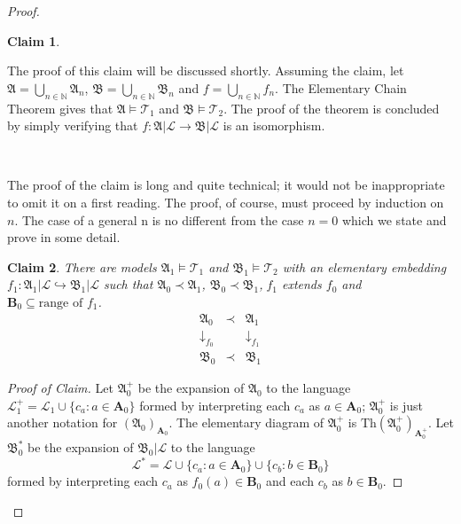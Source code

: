 \documentclass[titlepage, oneside]{amsbook}
\theoremstyle{plain}
\newtheorem*{claim}{Claim}
\theoremstyle{definition}
\theoremstyle{remark}
\newcommand{\Th}{\ensuremath{\mbox{Th}}}
\newcommand{\theory}{\ensuremath{\mathcal{T}}}
\newcommand{\lan}{\ensuremath{\mathcal{L}}}
\newcommand{\seq}{\ensuremath{\subseteq}}
\newcommand{\ma}{\ensuremath{\mathfrak{A}}}
\newcommand{\mb}{\ensuremath{\mathfrak{B}}}
\newcommand{\ba}{\ensuremath{\mathbf{A}}}
\newcommand{\bb}{\ensuremath{\mathbf{B}}}
\begin{document}
\begin{proof}
\begin{claim}
\end{claim}
 
\par
The proof of this claim will be discussed shortly. Assuming the
claim, let $\ma = \bigcup_{n \in \mathbb N} \ma_n$,
$\mb = \bigcup_{n \in \mathbb N} \mb_n$ and $f = \bigcup_{n \in \mathbb
N} f_n$.
The Elementary Chain Theorem gives that $\ma \models \theory_1$ and
$\mb
\models \theory_2$.  The proof of the theorem is concluded by simply
verifying that  $f: \ma | \lan \to \mb | \lan$ is an
isomorphism.

\

The proof of the claim is long and quite technical; it would not be
inappropriate to omit it on a first reading.  The proof, of course,
must proceed by induction on $n$.  The case of a general n is no
different from the case $n=0$ which we state and prove in some detail.

\begin{claim}  There are models $\ma_1 \models \theory_1 $ and $\mb_1
\models \theory_2 $ with an
elementary embedding $f_1 : \ma_1 |\lan \hookrightarrow \mb_1
|\lan $
such that $\ma_0 \prec \ma_1 $, $\mb_0 \prec \mb_1 $,$\; f_1 $ extends
$f_0$ 
and\\
$\bb_0 \seq \mbox{range of } f_1$.
\[ \begin{array}{ccc}
\ma_0  &\prec &\ma_1 \\
\downarrow_{f_0}  &{}  &\downarrow_{f_1} \\
\mb_0 &\prec &\mb_1
\end{array}
\]

\end{claim}

\begin{proof}[Proof of Claim] Let $\ma_0^+ $ be the expansion of $\ma_0 $
to
the
language $\lan_1^+ = \lan_1 \cup \{ c_a : a \in \ba_0 \} $ formed by
interpreting each $c_a  $ as $a \in \ba_0 $; $\ma_0^+ $ is just another
notation for $\left( \ma_0 \right)_{\ba_0} $.  The elementary diagram
of $\ma_0^+ $ is $\Th \left( \ma_0^+ \right)_{\ba_0^+} $. Let
$\mb_0^{\ast} $ be the
expansion of $\mb_0 |\lan $ to the language \[\lan^{\ast} = \lan \cup
\{ c_a : a \in \ba_0 \} \cup \{ c_b : b \in \bb_0 \} \] formed by
interpreting each $c_a $ as $f_0 (a) \in \bb_0 $
and each $c_b $ as $ b \in \bb_0$.


\end{proof}
\end{proof}
\end{document}
